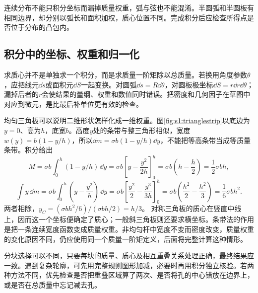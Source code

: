 连续分布不能只积分坐标而漏掉质量权重，弧与弦也不能混淆。半圆弧和半圆板有相同边界，却分别以弧长和面积加权，质心位置不同。完成积分后应检查所得点是否位于分布的凸包内。

\subsection{积分中的坐标、权重和归一化}
求质心并不是单独求一个积分，而是求质量一阶矩除以总质量。若换用角度参数$\theta$，应把线元$\dd s$或面积元$\dd S$一起变换。对圆弧$\dd s=R\dd\theta$，对圆板极坐标$\dd S=r\dd r\dd\theta$；漏掉后者的$r$会使结果的量纲、权重和数值同时错误。把密度和几何因子在草图中对应到微元，是比最后补单位更有效的检查。

均匀三角板可以说明二维形状怎样化成一维权重。图\ref{fig:s1:trianglestrip}以底边为$y=0$、高为$h$，底宽$b$。高度$y$处的条带与整三角形相似，宽度$w(y)=b(1-y/h)$，所以$\dd m=\sigma b(1-y/h)\dd y$，不能把等高条带当成等质量条带。积分给出
\[
M=\sigma b\int_0^h(1-y/h)\,\dd y
=\sigma b\left[y-\frac{y^2}{2h}\right]_0^h
=\sigma b\left(h-\frac h2\right)=\frac12\sigma bh,
\]
\[
\int y\,\dd m=\sigma b\int_0^h\left(y-\frac{y^2}{h}\right)\,\dd y
=\sigma b\left[\frac{y^2}{2}-\frac{y^3}{3h}\right]_0^h
=\sigma b\left(\frac{h^2}{2}-\frac{h^2}{3}\right)
=\frac16\sigma bh^2.
\]
两者相除，$y_C=(\sigma bh^2/6)/(\sigma bh/2)=h/3$。
对称三角板的质心在竖直中线上，因而这一个坐标便确定了质心；一般斜三角板则还要求横坐标。条带法的作用是把一条连续宽度函数变成质量权重。非均匀杆中宽度不变而密度改变，质量权重的变化原因不同，仍应使用同一个质量一阶矩定义，后面将完整计算这种情形。

分块选择可以不同，只要每块的质量、质心及相互重叠关系处理正确，最终结果应一致。遇到复杂轮廓，可先用完整规则图形加减，必要时再用积分独立核验。若两种方法不同，优先检查是否把重叠区域算了两次、是否将孔的中心错放在边界上，或是否在总质量中忘记减去孔。

